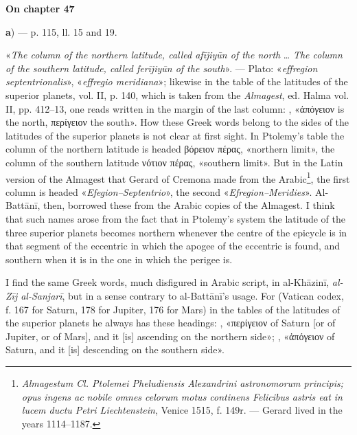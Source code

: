 \documentclass[11pt]{article}
\newcommand{\UnitHead}[2]{\par\setcounter{footnoteT}{0}\needspace{8\baselineskip}\bigskip\pdfbookmark[1]{#1}{unit-#2}\hypertarget{EN-#2}{}%
 {\large\bfseries\interlinepenalty=10000 #1\par}\nobreak\medskip}
\begin{document}
\UnitHead{On chapter 47}{A47}
\par\begin{center}\textbf{a}) — p. 115, ll. 15 and 19.\end{center}
\par «\emph{The column of the northern latitude, called afījiyūn of the north} … \emph{The column of the southern latitude, called ferījiyūn of the south}». — Plato: «\emph{effregion septentrionalis}», «\emph{effregio meridiana}»; likewise in the table of the latitudes of the superior planets, vol. II, p. 140, which is taken from the \emph{Almagest}, ed. Halma vol. II, pp. 412–13, one reads written in the margin of the last column: , «{\greekfont ἀπόγειον} is the north, {\greekfont περίγειον} the south». How these Greek words belong to the sides of the latitudes of the superior planets is not clear at first sight. In Ptolemy's table the column of the northern latitude is headed {\greekfont βόρειον πέρας}, «northern limit», the column of the southern latitude {\greekfont νότιον πέρας}, «southern limit». But in the Latin version of the Almagest that Gerard of Cremona made from the Arabic\footnote{\emph{Almagestum Cl. Ptolemei Pheludiensis Alexandrini astronomorum principis; opus ingens ac nobile omnes celorum motus continens Felicibus astris eat in lucem ductu Petri Liechtenstein}, Venice 1515, f. 149r. — Gerard lived in the years 1114–1187.}, the first column is headed «\emph{Efegion–Septentrio}», the second «\emph{Efregion–Meridies}». Al-Battānī, then, borrowed these from the Arabic copies of the Almagest. I think that such names arose from the fact that in Ptolemy's system the latitude of the three superior planets becomes northern whenever the centre of the epicycle is in that segment of the eccentric in which the apogee of the eccentric is found, and southern when it is in the one in which the perigee is.\par
\par I find the same Greek words, much disfigured in Arabic script, in al-Khāzinī, \emph{al-Zīj al-Sanjarī}, but in a sense contrary to al-Battānī's usage. For (Vatican codex, f. 167 for Saturn, 178 for Jupiter, 176 for Mars) in the tables of the latitudes of the superior planets he always has these headings: , «{\greekfont περίγειον} of Saturn [or of Jupiter, or of Mars], and it [is] ascending on the northern side»; , «{\greekfont ἀπόγειον} of Saturn, and it [is] descending on the southern side».\par
\end{document}
